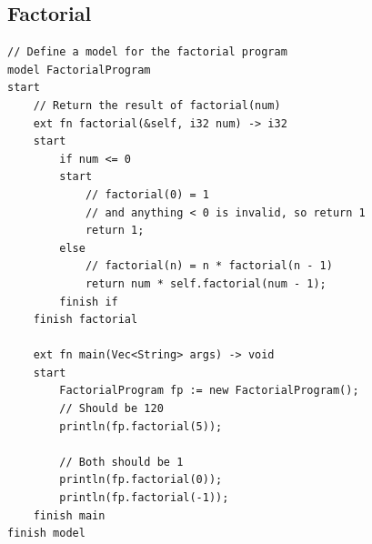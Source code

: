 \documentclass[letterpaper, 10pt, DIV=13]{scrartcl}
\numberwithin{equation}{section}
\numberwithin{figure}{section}
\numberwithin{table}{section}
\begin{document}
\subsection{Factorial}
\begin{lstlisting}[caption = FatorialProgram.rez, frame = single, nolol]
// Define a model for the factorial program
model FactorialProgram
start
    // Return the result of factorial(num)
    ext fn factorial(&self, i32 num) -> i32
    start
        if num <= 0
        start
            // factorial(0) = 1
            // and anything < 0 is invalid, so return 1
            return 1;
        else
            // factorial(n) = n * factorial(n - 1)
            return num * self.factorial(num - 1);
        finish if
    finish factorial

    ext fn main(Vec<String> args) -> void
    start
        FactorialProgram fp := new FactorialProgram();
        // Should be 120
        println(fp.factorial(5));

        // Both should be 1
        println(fp.factorial(0));
        println(fp.factorial(-1));
    finish main
finish model
\end{lstlisting}
\end{document}
